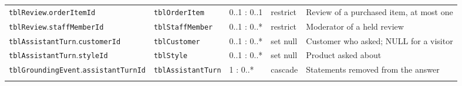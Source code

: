 {\begin{xltabular}{\textwidth}{@{}L{4.0cm} L{3.2cm} L{1.3cm} L{1.2cm} Y@{}}
\texttt{tblReview}.\allowbreak\texttt{orderItemId} & \texttt{tblOrderItem} & 0..1 : 0..1 & restrict & Review of a purchased item, at most one \\
\texttt{tblReview}.\allowbreak\texttt{staffMemberId} & \texttt{tblStaffMember} & 0..1 : 0..* & restrict & Moderator of a held review \\
\texttt{tblAssistantTurn}.\allowbreak\texttt{customerId} & \texttt{tblCustomer} & 0..1 : 0..* & set null & Customer who asked; NULL for a visitor \\
\texttt{tblAssistantTurn}.\allowbreak\texttt{styleId} & \texttt{tblStyle} & 0..1 : 0..* & set null & Product asked about \\
\texttt{tblGroundingEvent}.\allowbreak\texttt{assistantTurnId} & \texttt{tblAssistantTurn} & 1 : 0..* & cascade & Statements removed from the answer \\ \addlinespace
\end{xltabular}
}

